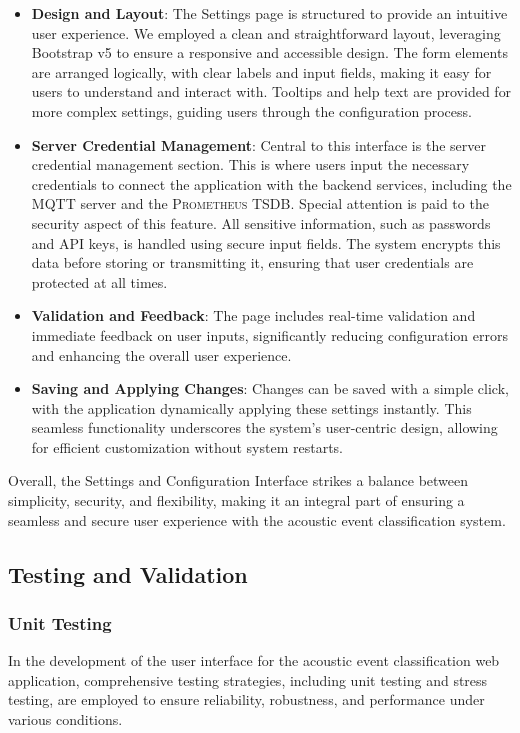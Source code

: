 \begin{itemize}
  \item \textbf{Design and Layout}: The Settings page is structured to provide an intuitive user experience. We employed a clean and straightforward layout, leveraging Bootstrap v5 to ensure a responsive and accessible design. The form elements are arranged logically, with clear labels and input fields, making it easy for users to understand and interact with. Tooltips and help text are provided for more complex settings, guiding users through the configuration process.
  \item \textbf{Server Credential Management}: Central to this interface is the server credential management section. This is where users input the necessary credentials to connect the application with the backend services, including the MQTT server and the \textsc{Prometheus} TSDB. Special attention is paid to the security aspect of this feature. All sensitive information, such as passwords and API keys, is handled using secure input fields. The system encrypts this data before storing or transmitting it, ensuring that user credentials are protected at all times.
  \item \textbf{Validation and Feedback}: The page includes real-time validation and immediate feedback on user inputs, significantly reducing configuration errors and enhancing the overall user experience.
  \item \textbf{Saving and Applying Changes}: Changes can be saved with a simple click, with the application dynamically applying these settings instantly. This seamless functionality underscores the system's user-centric design, allowing for efficient customization without system restarts.
\end{itemize}

Overall, the Settings and Configuration Interface strikes a balance between simplicity, security, and flexibility, making it an integral part of ensuring a seamless and secure user experience with the acoustic event classification system.


\subsection{Testing and Validation}
\subsubsection{Unit Testing}
In the development of the user interface for the acoustic event classification web application, comprehensive testing strategies, including unit testing and stress testing, are employed to ensure reliability, robustness, and performance under various conditions.

